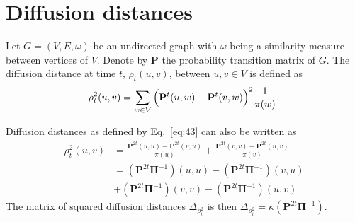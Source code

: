 \section{Diffusion distances}
\label{sec:diffusion-distances}
Let $G = (V,E,\omega)$ be an undirected graph with
$\omega$ being a similarity measure between vertices of $V$. Denote by
$\mathbf{P}$ the probability transition matrix of $G$. The diffusion
distance at time $t$, $\rho_{t}(u,v)$, between $u,v \in V$ is defined as
\citep{coifman06:_diffus_maps}
\begin{equation}
  \label{eq:43}
  \rho^{2}_{t}(u,v) = \sum_{w \in V}{\Bigl(\mathbf{P}^{t}(u,w) -
      \mathbf{P}^{t}(v,w)\Bigr)^2 \frac{1}{\pi(w)}}.
\end{equation}
\begin{proposition}
  \label{prop:12}
  Diffusion distances as defined by Eq.~\eqref{eq:43} can also be
  written as
  \begin{equation}
    \label{eq:44}
    \begin{split}
      \rho_{t}^{2}(u,v) &= \frac{\mathbf{P}^{2t}(u,u) -
        \mathbf{P}^{2t}(v,u)}{\pi(u)} +
      \frac{\mathbf{P}^{2t}(v,v) -
        \mathbf{P}^{2t}(u,v)}{\pi(v)}  \\
      &= (\mathbf{P}^{2t}\bm{\Pi}^{-1})(u,u) -
      (\mathbf{P}^{2t}\bm{\Pi}^{-1})(v,u) \\
      &+ (\mathbf{P}^{2t}\bm{\Pi}^{-1})(v,v) -
      (\mathbf{P}^{2t}\bm{\Pi}^{-1})(u,v)
    \end{split}
  \end{equation}
The matrix of squared diffusion distances $\Delta_{\rho_t^2}$ is then
$\Delta_{\rho_t^2} = \kappa(\mathbf{P}^{2t}\bm{\Pi}^{-1})$. 
\end{proposition}
